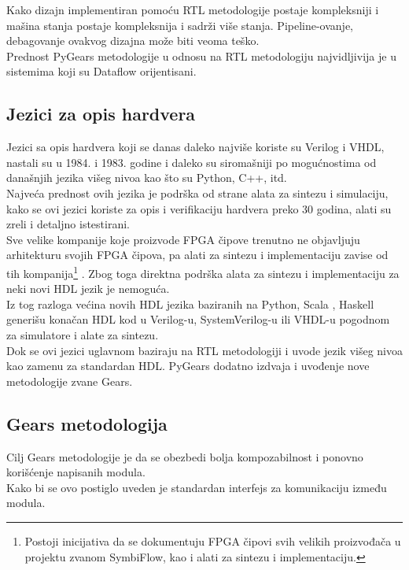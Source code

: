 Kako dizajn implementiran pomoću RTL metodologije postaje kompleksniji i mašina
stanja postaje kompleksnija i sadrži više stanja.
Pipeline-ovanje, debagovanje  ovakvog dizajna može biti veoma teško. \\
Prednost PyGears metodologije u odnosu na RTL metodologiju najvidljivija je u
sistemima koji su Dataflow orijentisani.

\subsection{Jezici za opis hardvera}

Jezici sa opis hardvera koji se danas daleko najviše koriste su Verilog i VHDL,
nastali su u 1984. i 1983. godine i daleko su siromašniji po mogućnostima od današnjih
jezika višeg nivoa kao što su Python, C++, itd. \\
Najveća prednost ovih jezika je podrška od strane alata za sintezu i simulaciju,
kako se ovi jezici koriste za opis i verifikaciju hardvera preko 30 godina,
alati su zreli i detaljno istestirani. \\

Sve velike kompanije koje proizvode FPGA čipove trenutno ne objavljuju
arhitekturu svojih FPGA čipova, pa alati za sintezu i implementaciju zavise od
tih kompanija\footnote{Postoji inicijativa da se dokumentuju FPGA čipovi svih velikih
proizvođača u projektu zvanom SymbiFlow\cite{SymbiFlow}, kao i alati za sintezu
i implementaciju.}
.
Zbog toga direktna podrška alata za sintezu i implementaciju za neki novi HDL jezik je
nemoguća. \\

Iz tog razloga većina novih HDL jezika baziranih na
Python\cite{decaluwe2004myhdl, PyGears_OSDA}, Scala
\cite{bachrach2012chisel, SpinalHDL}, Haskell\cite{baaij2010c} generišu konačan
HDL kod u Verilog-u, SystemVerilog-u ili VHDL-u pogodnom za simulatore i alate
za sintezu. \\

Dok se ovi jezici uglavnom baziraju na RTL metodologiji i uvode jezik višeg
nivoa kao zamenu za standardan HDL. PyGears dodatno izdvaja i uvođenje nove
metodologije zvane Gears.

\subsection{Gears metodologija}
Cilj Gears metodologije je da se obezbedi bolja kompozabilnost i ponovno
korišćenje napisanih modula. \\
Kako bi se ovo postiglo uveden je standardan interfejs za komunikaciju između
modula.

